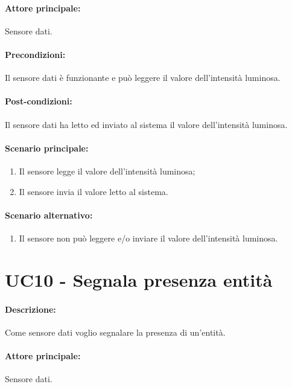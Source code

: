 \paragraph{Attore principale:}
Sensore dati.

\paragraph{Precondizioni:}
Il sensore dati è funzionante e può leggere il valore dell'intensità luminosa.

\paragraph{Post-condizioni:}
Il sensore dati ha letto ed inviato al sistema il valore dell'intensità luminosa.

\paragraph{Scenario principale:}
\begin{enumerate}
    \item Il sensore legge il valore dell'intensità luminosa;
    \item Il sensore invia il valore letto al sistema.
\end{enumerate}

\paragraph{Scenario alternativo:}
\begin{enumerate}
    \item Il sensore non può leggere e/o inviare il valore dell'intensità luminosa.
\end{enumerate}

\section{UC10 - Segnala presenza entità}

\paragraph{Descrizione:}
Come sensore dati voglio segnalare la presenza di un'entità.

\paragraph{Attore principale:}
Sensore dati.

